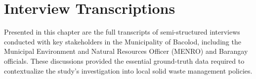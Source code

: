 \chapter{Interview Transcriptions}
\label{ch:appendix_b}

Presented in this chapter are the full transcripts of semi-structured interviews conducted with key stakeholders in the Municipality of Bacolod, including the Municipal Environment and Natural Resources Officer (MENRO) and Barangay officials. These discussions provided the essential ground-truth data required to contextualize the study's investigation into local solid waste management policies.


\newpage


\newpage


\newpage


\newpage


\newpage


\newpage


\newpage


\newpage
